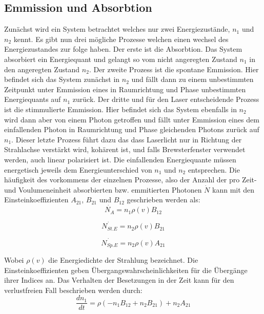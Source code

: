 \subsection{Emmission und Absorbtion}
\label{sec:EmmissionUndAbsorbtion}
Zunächst wird ein System betrachtet welches nur zwei Energiezustände, $n_1$ und $n_2$ kennt.
Es gibt nun drei mögliche Prozesse welchen einen wechsel des Energiezustandes zur folge haben.
Der erste ist die Absorbtion. Das System absorbiert ein Energiequant und gelangt so vom nicht 
angeregten Zustand $n_1$ in den angeregten Zustand $n_2$. Der zweite Prozess ist die spontane
Emmission. Hier befindet sich das System zunächst in $n_2$ und fällt dann zu einem unbestimmten 
Zeitpunkt unter Emmission eines in Raumrichtung und Phase unbestimmten Energiequants auf $n_1$ zurück.
Der dritte und für den Laser entscheidende Prozess ist die stimmulierte Emmission. Hier befindet sich 
das System ebenfalls in $n_2$ wird dann aber von einem Photon getroffen und fällt unter Emmission
eines dem einfallenden Photon in Raumrichtung und Phase gleichenden Photons zurück auf $n_1$. Dieser letzte
Prozess führt dazu das dass Laserlicht nur in Richtung der Strahlachse verstärkt wird, kohärent ist, und
falls Brewsterfenster verwendet werden, auch linear polarisiert ist. Die einfallenden Energiequante müssen 
energetisch jeweils dem Energieunterschied von $n_1$ und $n_2$ entsprechen. Die häufigkeit des vorkommens der
einzelnen Prozesse, also der Anzahl der pro Zeit- und Voulumeneinheit absorbierten bzw. emmitierten Photonen
$\dot{N}$ kann mit den Einsteinkoeffizienten $A_{21}$, $B_{21}$ und $B_{12}$ geschrieben werden als:
\begin{equation}
    \dot{N_A}=n_1\rho(v)B_{12}
\end{equation}


\begin{equation}
    \dot{N_{St.E}}=n_2\rho(v)B_{21}
\end{equation}


\begin{equation}
    \dot{N_{Sp.E}}=n_2\rho(v)A_{21}
\end{equation}

Wobei $\rho(v)$ die Energiedichte der Strahlung bezeichnet. Die Einsteinkoeffizienten geben 
Übergangswahrscheinlichkeiten für die Übergänge ihrer Indices an.
Das Verhalten der Besetzungen in der Zeit kann für den verlustfreien Fall beschrieben werden durch:
\begin{equation}
    \label{eq:1}
    \frac{dn_1}{dt}=\rho(-n_1B_{12}+n_2B_{21})+n_2A_{21}
\end{equation}


